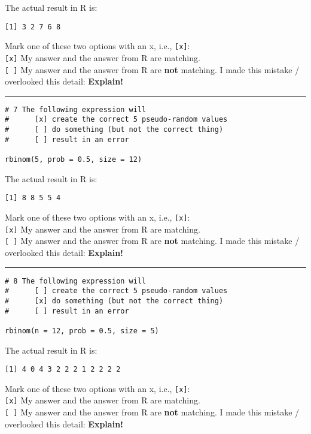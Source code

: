 \documentclass[12pt,letterpaper,final]{article}\usepackage[]{graphicx}\usepackage[]{xcolor}
\begin{document}
\begin{enumerate}
The actual result in R is: 
\begin{verbatim}
[1] 3 2 7 6 8
\end{verbatim}

Mark one of these two options with an x, i.e., \verb|[x]|: \\
\verb|[x]| My answer and the answer from R are matching. \\
\verb|[ ]| My answer and the answer from R are {\bf not} matching. 
I made this mistake / overlooked this detail: {\bf Explain!} \\


\hrule


\begin{verbatim}
# 7 The following expression will
#      [x] create the correct 5 pseudo-random values
#      [ ] do something (but not the correct thing)
#      [ ] result in an error

rbinom(5, prob = 0.5, size = 12)
\end{verbatim}

The actual result in R is: 
\begin{verbatim}
[1] 8 8 5 5 4
\end{verbatim}

Mark one of these two options with an x, i.e., \verb|[x]|: \\
\verb|[x]| My answer and the answer from R are matching. \\
\verb|[ ]| My answer and the answer from R are {\bf not} matching. 
I made this mistake / overlooked this detail: {\bf Explain!} \\


\hrule


\begin{verbatim}
# 8 The following expression will
#      [ ] create the correct 5 pseudo-random values
#      [x] do something (but not the correct thing)
#      [ ] result in an error

rbinom(n = 12, prob = 0.5, size = 5)
\end{verbatim}

The actual result in R is: 
\begin{verbatim}
[1] 4 0 4 3 2 2 2 1 2 2 2 2
\end{verbatim}

Mark one of these two options with an x, i.e., \verb|[x]|: \\
\verb|[x]| My answer and the answer from R are matching. \\
\verb|[ ]| My answer and the answer from R are {\bf not} matching. 
I made this mistake / overlooked this detail: {\bf Explain!} \\



\end{enumerate}
\end{document}
